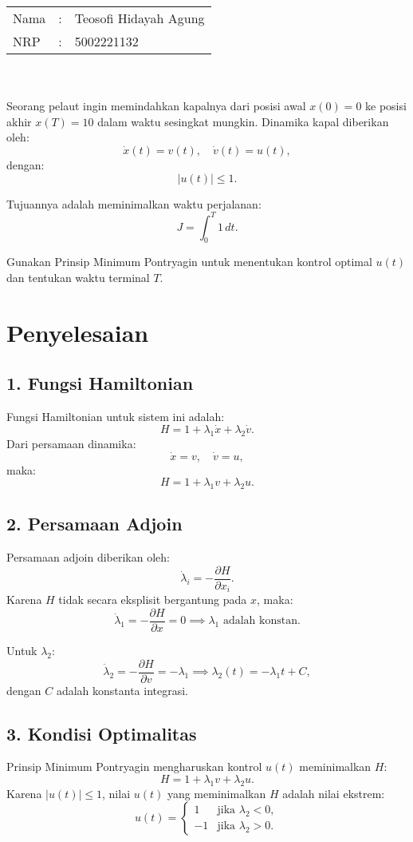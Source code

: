 \documentclass{article}
\begin{document}
\setlength{\parindent}{0pt}
    \noindent
    \begin{tabular}{|lcl|}
     \hline
     Nama&:&Teosofi Hidayah Agung\\
     NRP&:&5002221132\\
     \hline
    \end{tabular}\\~\\
Seorang pelaut ingin memindahkan kapalnya dari posisi awal $x(0) = 0$ ke posisi akhir $x(T) = 10$ dalam waktu sesingkat mungkin. Dinamika kapal diberikan oleh:
\[
\dot{x}(t) = v(t), \quad \dot{v}(t) = u(t),
\]
dengan:
\[
|u(t)| \leq 1.
\]

Tujuannya adalah meminimalkan waktu perjalanan:
\[
J = \int_0^T 1 \, dt.
\]

Gunakan Prinsip Minimum Pontryagin untuk menentukan kontrol optimal $u(t)$ dan tentukan waktu terminal $T$.

\section*{Penyelesaian}

\subsection*{1. Fungsi Hamiltonian}
Fungsi Hamiltonian untuk sistem ini adalah:
\[
H = 1 + \lambda_1 \dot{x} + \lambda_2 \dot{v}.
\]
Dari persamaan dinamika:
\[
\dot{x} = v, \quad \dot{v} = u,
\]
maka:
\[
H = 1 + \lambda_1 v + \lambda_2 u.
\]

\subsection*{2. Persamaan Adjoin}
Persamaan adjoin diberikan oleh:
\[
\dot{\lambda}_i = -\frac{\partial H}{\partial x_i}.
\]
Karena $H$ tidak secara eksplisit bergantung pada $x$, maka:
\[
\dot{\lambda}_1 = -\frac{\partial H}{\partial x} = 0 \implies \lambda_1 \text{ adalah konstan.}
\]

Untuk $\lambda_2$:
\[
\dot{\lambda}_2 = -\frac{\partial H}{\partial v} = -\lambda_1 \implies \lambda_2(t) = -\lambda_1 t + C,
\]
dengan $C$ adalah konstanta integrasi.

\subsection*{3. Kondisi Optimalitas}
Prinsip Minimum Pontryagin mengharuskan kontrol $u(t)$ meminimalkan $H$:
\[
H = 1 + \lambda_1 v + \lambda_2 u.
\]
Karena $|u(t)| \leq 1$, nilai $u(t)$ yang meminimalkan $H$ adalah nilai ekstrem:
\[
u(t) = \begin{cases}
1 & \text{jika } \lambda_2 < 0, \\
-1 & \text{jika } \lambda_2 > 0.
\end{cases}
\]
\end{document}
